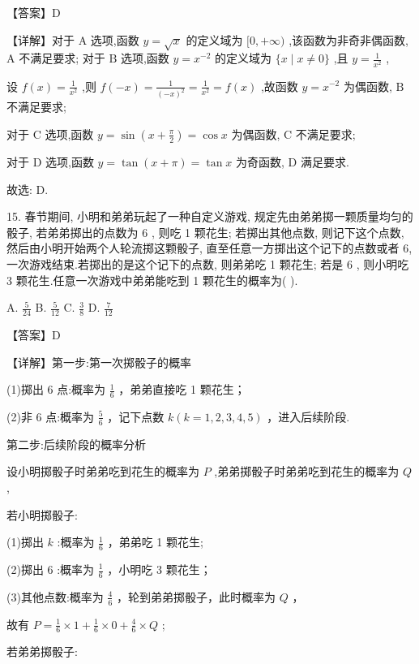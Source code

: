 \documentclass[10pt]{article}
\newcommand*\circled[1]{\tikz[baseline=(char.base)]{\node[shape=circle,draw,inner sep=1.5pt] (char) {\small #1};}}
\begin{document}
【答案】D

【详解】对于 \(\mathrm{A}\) 选项,函数 \(y = \sqrt{x}\) 的定义域为 \(\lbrack 0, + \infty )\) ,该函数为非奇非偶函数, \(\mathrm{A}\) 不满足要求; 对于 \(\mathrm{B}\) 选项,函数 \(y = {x}^{-2}\) 的定义域为 \(\{ x \mid  x \neq  0\}\) ,且 \(y = \frac{1}{{x}^{2}}\) ,

设 \(f\left( x\right)  = \frac{1}{{x}^{2}}\) ,则 \(f\left( {-x}\right)  = \frac{1}{{\left( -x\right) }^{2}} = \frac{1}{{x}^{2}} = f\left( x\right)\) ,故函数 \(y = {x}^{-2}\) 为偶函数, \(\mathrm{B}\) 不满足要求;

对于 \(\mathrm{C}\) 选项,函数 \(y = \sin \left( {x + \frac{\pi }{2}}\right)  = \cos x\) 为偶函数, \(\mathrm{C}\) 不满足要求;

对于 \(\mathrm{D}\) 选项,函数 \(y = \tan \left( {x + \pi }\right)  = \tan x\) 为奇函数, \(\mathrm{D}\) 满足要求.

故选: D.

15. 春节期间, 小明和弟弟玩起了一种自定义游戏, 规定先由弟弟掷一颗质量均匀的骰子, 若弟弟掷出的点数为 6 , 则吃 1 颗花生; 若掷出其他点数, 则记下这个点数, 然后由小明开始两个人轮流掷这颗骰子, 直至任意一方掷出这个记下的点数或者 6, 一次游戏结束.若掷出的是这个记下的点数, 则弟弟吃 1 颗花生; 若是 6 , 则小明吃 3 颗花生.任意一次游戏中弟弟能吃到 1 颗花生的概率为( ).

A. \(\frac{5}{24}\) B. \(\frac{5}{12}\) C. \(\frac{3}{8}\) D. \(\frac{7}{12}\)

【答案】D

【详解】第一步:第一次掷骰子的概率

(1)掷出 6 点:概率为 \(\frac{1}{6}\) ，弟弟直接吃 1 颗花生；

(2)非 6 点:概率为 \(\frac{5}{6}\) ，记下点数 \(k\left( {k = 1,2,3,4,5}\right)\) ，进入后续阶段.

第二步:后续阶段的概率分析

设小明掷骰子时弟弟吃到花生的概率为 \(P\) ,弟弟掷骰子时弟弟吃到花生的概率为 \(Q\) ,

若小明掷骰子:

(1)掷出 \(k\) :概率为 \(\frac{1}{6}\) ，弟弟吃 1 颗花生;

(2)掷出 6 :概率为 \(\frac{1}{6}\) ，小明吃 3 颗花生；

(3)其他点数:概率为 \(\frac{4}{6}\) ，轮到弟弟掷骰子，此时概率为 \(Q\) ，

故有 \(P = \frac{1}{6} \times  1 + \frac{1}{6} \times  0 + \frac{4}{6} \times  Q\)  \circled{1} ;

若弟弟掷骰子:
\end{document}

